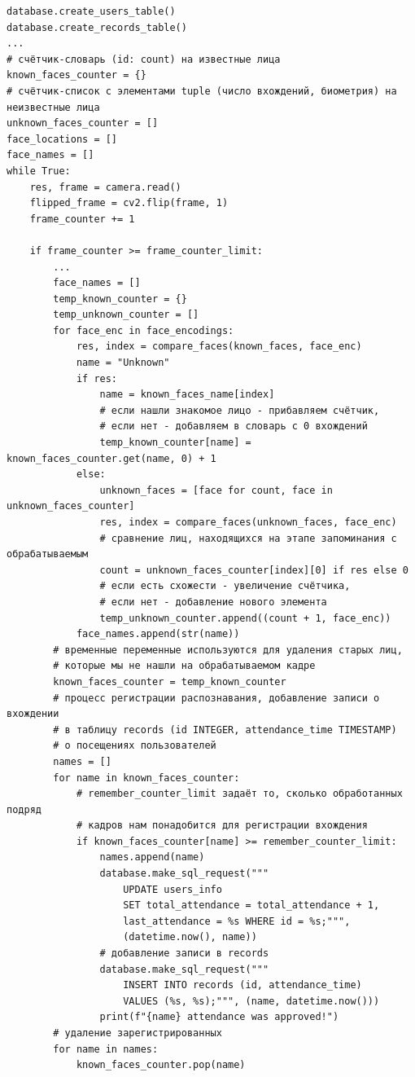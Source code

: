 \documentclass[a4paper,hidelinks,14pt]{extarticle}
\begin{document}
	\begin{verbatim}
database.create_users_table()
database.create_records_table()
...
# счётчик-словарь (id: count) на известные лица
known_faces_counter = {}
# cчётчик-список с элементами tuple (число вхождений, биометрия) на неизвестные лица
unknown_faces_counter = []
face_locations = []
face_names = []
while True:
	res, frame = camera.read()
	flipped_frame = cv2.flip(frame, 1)
	frame_counter += 1

	if frame_counter >= frame_counter_limit:
		...
		face_names = []
		temp_known_counter = {}
		temp_unknown_counter = []
		for face_enc in face_encodings:
			res, index = compare_faces(known_faces, face_enc)
			name = "Unknown"
			if res:
				name = known_faces_name[index]
				# если нашли знакомое лицо - прибавляем счётчик,
				# если нет - добавляем в словарь с 0 вхождений
				temp_known_counter[name] = known_faces_counter.get(name, 0) + 1
			else:
				unknown_faces = [face for count, face in unknown_faces_counter]
				res, index = compare_faces(unknown_faces, face_enc)
				# сравнение лиц, находящихся на этапе запоминания с обрабатываемым
				count = unknown_faces_counter[index][0] if res else 0
				# если есть схожести - увеличение счётчика,
				# если нет - добавление нового элемента
				temp_unknown_counter.append((count + 1, face_enc))
			face_names.append(str(name))
		# временные переменные используются для удаления старых лиц, 
		# которые мы не нашли на обрабатываемом кадре
		known_faces_counter = temp_known_counter
		# процесс регистрации распознавания, добавление записи о вхождении
		# в таблицу records (id INTEGER, attendance_time TIMESTAMP)
		# о посещениях пользователей
		names = []
		for name in known_faces_counter:
			# remember_counter_limit задаёт то, сколько обработанных подряд
			# кадров нам понадобится для регистрации вхождения
			if known_faces_counter[name] >= remember_counter_limit:
				names.append(name)
				database.make_sql_request("""
					UPDATE users_info
					SET total_attendance = total_attendance + 1,
					last_attendance = %s WHERE id = %s;""",
					(datetime.now(), name))
				# добавление записи в records
				database.make_sql_request("""
					INSERT INTO records (id, attendance_time)
					VALUES (%s, %s);""", (name, datetime.now()))
				print(f"{name} attendance was approved!")
		# удаление зарегистрированных
		for name in names:
			known_faces_counter.pop(name)
			

\end{verbatim}
\end{document}
